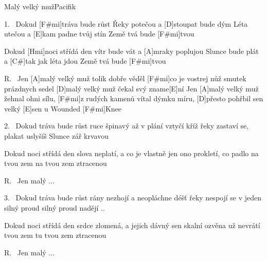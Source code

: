 \begin{song}{Malý velký muž}{Pacifik}


\begin{xverse}{1.~}
Dokud [F#mi]tráva bude růst
Řeky potečou a [D]stoupat bude dým
Léta utečou a [E]kam padne tvůj stín
Země tvá bude [F#mi]tvou

Dokud [Hmi]noci střídá den
vítr bude vát a [A]mraky poplujou
Slunce bude plát a [C#]tak jak léta jdou
Země tvá bude [F#mi]tvou
\end{xverse}


\begin{xverse}{R.~}
Jen [A]malý velký muž
tolik dobře věděl [F#mi]co je vostrej nůž
smutek prázdnych sedel
[D]malý velký muž čekal svý zname[E]ní
Jen [A]malý velký muž
žehnal ohni sílu, [F#mi]z rudých kamenů
vítal dýmku míru, [D]přesto pohřbil sen
velký [E]sen u Wounded [F#mi]Knee
\end{xverse}


\begin{xverse}{2.~}
Dokud tráva bude růst
ruce špinavý až v plání vztyčí kříž
řeky zastaví se, plakat uslyšíš
Slunce zář krvavou

Dokud noci střídá den
slova neplatí, a co je vlastně jen
ono prokletí, co padlo na tvou zem
na tvou zem ztracenou
\end{xverse}


\begin{xverse}{R.~}
Jen malý ...
\end{xverse}

\begin{xverse}{3.~}
Dokud tráva bude růst
rány nezhojí a neopláchne déšť
řeky nespojí se v jeden silný proud
silný proud nadějí ..

Dokud noci střídá den
srdce zlomená, a jejich dávný sen
skalní ozvěna už nevrátí tvou zem
tu tvou zem ztracenou
\end{xverse}

\begin{xverse}{R.~}
Jen malý ...
\end{xverse}
\end{song}

